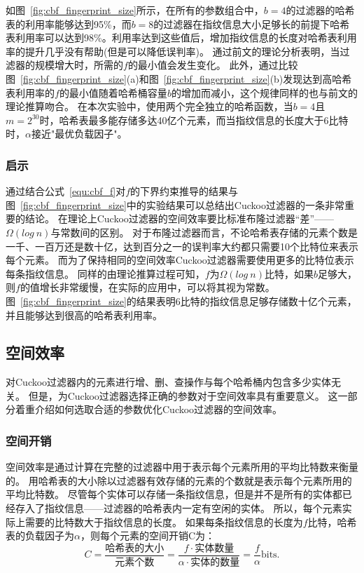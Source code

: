 如图~\ref{fig:cbf_fingerprint_size}所示，在所有的参数组合中，$b = 4$的过滤器的哈希表的利用率能够达到95\%，而$b = 8$的过滤器在指纹信息大小足够长的前提下哈希表利用率可以达到98\%。利用率达到这些值后，增加指纹信息的长度对哈希表利用率的提升几乎没有帮助(但是可以降低误判率)。
通过前文的理论分析表明，当过滤器的规模增大时，所需的$f$的最小值会发生变化。
此外，通过比较图~\ref{fig:cbf_fingerprint_size}(a)和图~\ref{fig:cbf_fingerprint_size}(b)发现达到高哈希表利用率的$f$的最小值随着哈希桶容量$b$的增加而减小，这个规律同样的也与前文的理论推算吻合。
在本次实验中，使用两个完全独立的哈希函数，当$b = 4$且$m = 2^{30}$时，哈希表最多能存储多达40亿个元素，而当指纹信息的长度大于6比特时，$\alpha$接近"最优负载因子"。

\subsubsection{启示}
通过结合公式~\ref{equ:cbf_f}对$f$的下界约束推导的结果与图~\ref{fig:cbf_fingerprint_size}中的实验结果可以总结出Cuckoo过滤器的一条非常重要的结论。
在理论上Cuckoo过滤器的空间效率要比标准布隆过滤器“差”——
$\Omega(log~n)$与常数间的区别。
对于布隆过滤器而言，不论哈希表存储的元素个数是一千、一百万还是数十亿，达到百分之一的误判率大约都只需要10个比特位来表示每个元素。
而为了保持相同的空间效率Cuckoo过滤器需要使用更多的比特位表示每条指纹信息。
同样的由理论推算过程可知，$f$为$\Omega(log~n)$比特，如果$b$足够大，则$f$的值增长非常缓慢，在实际的应用中，可以将其视为常数。
图~\ref{fig:cbf_fingerprint_size}的结果表明6比特的指纹信息足够存储数十亿个元素，并且能够达到很高的哈希表利用率。

\subsection{空间效率}
对Cuckoo过滤器内的元素进行增、删、查操作与每个哈希桶内包含多少实体无关。
但是，为Cuckoo过滤器选择正确的参数对于空间效率具有重要意义。
这一部分着重介绍如何选取合适的参数优化Cuckoo过滤器的空间效率。

\subsubsection{空间开销}
空间效率是通过计算在完整的过滤器中用于表示每个元素所用的平均比特数来衡量的。
用哈希表的大小除以过滤器有效存储的元素的个数就是表示每个元素所用的平均比特数。
尽管每个实体可以存储一条指纹信息，但是并不是所有的实体都已经存入了指纹信息——过滤器的哈希表内一定有空闲的实体。
所以，每个元素实际上需要的比特数大于指纹信息的长度。
如果每条指纹信息的长度为$f$比特，哈希表的负载因子为$\alpha$，则每个元素的空间开销C为：
\begin{equation}
C = \frac{\text{哈希表的大小}}{\text{元素个数}} = \frac{f\cdot \text{实体数量}}{\alpha \cdot \text{实体的数量}} = \frac{f}{\alpha} \text{bits.}
\label{equ:space_cost}
\end{equation}


